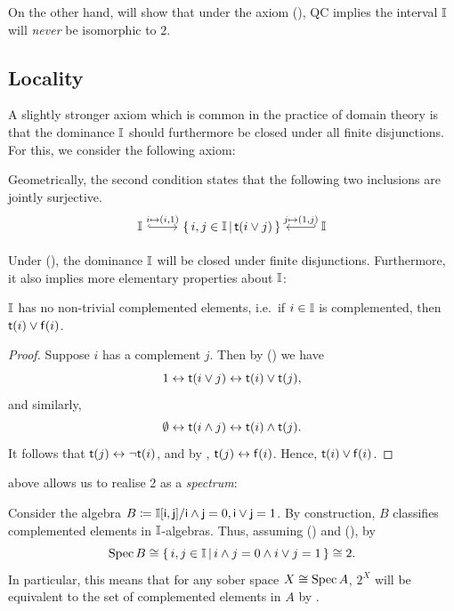 On the other hand,  will show that under the axiom (\AxiomNT), \gls{QC} implies the interval $\mathbb{I}$ will \emph{never} be isomorphic to $2$. 

\subsection{Locality}

A slightly stronger axiom which is common in the practice of domain theory is that the dominance $\mathbb{I}$ should furthermore be closed under all finite disjunctions. For this, we consider the following axiom:

\PrintAxiomL

Geometrically, the second condition states that the following two inclusions are jointly surjective. 
\[ 
\begin{tikzcd}
  \mbb{I} \ar[r, hook, "{i \mapsto (i,1)}"] & \scomp{i,j \in \mbb{I}}{\ist{i\vee j}} & \mbb{I} \ar[l, hook', "{j \mapsto (1,j)}"']
\end{tikzcd}
\]

Under (\AxiomL), the dominance $\mathbb{I}$ will be closed under finite disjunctions. Furthermore, it also implies more elementary properties about $\mathbb{I}$:

\begin{lemma}[\AxiomL, \AxiomSQCID]\label{lem:intisnotBoolean}
  $\mathbb{I}$ has no non-trivial complemented elements, i.e.\ if $i \in \mathbb{I}$ is complemented, then $\mathsf{t}(i) \vee \mathsf{f}(i)$. 
\end{lemma}
\begin{proof}
  Suppose $i$ has a complement $j$. Then by (\AxiomL) we have
  \[ 1 \leftrightarrow \mathsf{t}(i\vee j) \leftrightarrow \mathsf{t}(i) \vee \mathsf{t}(j)\text{,} \]
  and similarly,
  \[ \emptyset \leftrightarrow \mathsf{t}(i\wedge j) \leftrightarrow \mathsf{t}(i) \wedge \mathsf{t}(j)\text{.} \]
  It follows that $\mathsf{t}(j) \leftrightarrow \neg \mathsf{t}(i)$, and by , $\mathsf{t}(j) \leftrightarrow \mathsf{f}(i)$. Hence, $\mathsf{t}(i) \vee \mathsf{f}(i)$.
\end{proof}

 above allows us to realise 2 as a \emph{spectrum}:

\begin{example}\label{exm:2issober}
  Consider the algebra $B \coloneq \mathbb{I}[\mathsf{i},\mathsf{j}]/{\mathsf{i}\wedge \mathsf{j} =0,\mathsf{i}\vee \mathsf{j} = 1}$. By construction, $B$ classifies complemented elements in $\mathbb{I}$-algebras. Thus, assuming (\AxiomL) and (\AxiomSQCI), by 
  \[ \operatorname{Spec} B \cong \left\{\,i,j \in \mathbb{I}\,\middle|\,i \wedge j = 0 \wedge i \vee j = 1\,\right\} \cong 2\text{.} \]
  In particular, this means that for any sober space $X \cong \operatorname{Spec} A$, $2^X$ will be equivalent to the set of complemented elements in $A$ by .
\end{example}

